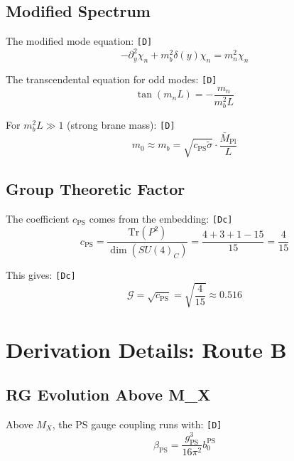 \documentclass[11pt,a4paper]{article}
\newcommand{\tagD}{\textcolor{green!50!black}{\texttt{[D]}}}
\newcommand{\tagDc}{\textcolor{blue!70!black}{\texttt{[Dc]}}}
\theoremstyle{definition}
\begin{document}
\subsection{Modified Spectrum}
\label{app:modified-spectrum}

The modified mode equation: \tagD{}
\begin{equation}
\label{eq:modified-mode-eq}
-\partial_y^2 \chi_n + m_b^2 \delta(y) \chi_n = m_n^2 \chi_n
\end{equation}

The transcendental equation for odd modes: \tagD{}
\begin{equation}
\label{eq:transcendental}
\tan(m_n L) = -\frac{m_n}{m_b^2 L}
\end{equation}

For $m_b^2 L \gg 1$ (strong brane mass): \tagD{}
\begin{equation}
\label{eq:strong-mass-approx}
m_0 \approx m_b = \sqrt{c_{\text{PS}} \tilde{\sigma}} \cdot \frac{\bar{M}_{\text{Pl}}}{L}
\end{equation}

\subsection{Group Theoretic Factor}
\label{app:group-factor}

The coefficient $c_{\text{PS}}$ comes from the embedding: \tagDc{}
\begin{equation}
\label{eq:c-ps-derivation}
c_{\text{PS}} = \frac{\text{Tr}(P^2)}{\dim(SU(4)_C)} = \frac{4 + 3 + 1 - 15}{15} = \frac{4}{15}
\end{equation}

This gives: \tagDc{}
\begin{equation}
\label{eq:g-final}
\mathcal{G} = \sqrt{c_{\text{PS}}} = \sqrt{\frac{4}{15}} \approx 0.516
\end{equation}

\section{Derivation Details: Route B}
\label{app:route-b-details}

\subsection{RG Evolution Above M\_X}
\label{app:rg-above}

Above $M_X$, the PS gauge coupling runs with: \tagD{}
\begin{equation}
\label{eq:beta-ps}
\beta_{\text{PS}} = \frac{g_{\text{PS}}^3}{16\pi^2} b_0^{\text{PS}}
\end{equation}
\end{document}
